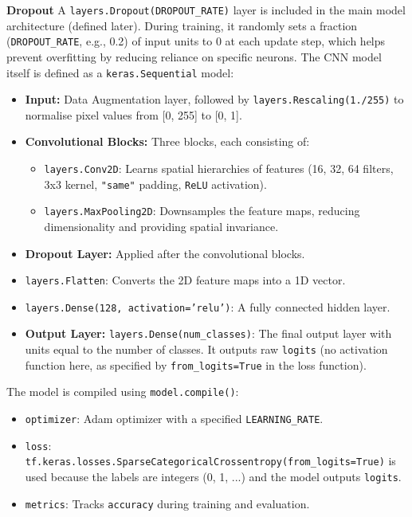 \textbf{Dropout}
A \verb|layers.Dropout(DROPOUT_RATE)| layer is included in the main model architecture (defined later). During training, it randomly sets a fraction (\verb|DROPOUT_RATE|, e.g., 0.2) of input units to 0 at each update step, which helps prevent overfitting by reducing reliance on specific neurons. The CNN model itself is defined as a \verb|keras.Sequential| model:
\begin{itemize}
    \item \textbf{Input:} Data Augmentation layer, followed by \verb|layers.Rescaling(1./255)| to normalise pixel values from [0, 255] to [0, 1].
    \item \textbf{Convolutional Blocks:} Three blocks, each consisting of:
    \begin{itemize}
        \item \verb|layers.Conv2D|: Learns spatial hierarchies of features (16, 32, 64 filters, 3x3 kernel, \verb|"same"| padding, \verb|ReLU| activation).
        \item \verb|layers.MaxPooling2D|: Downsamples the feature maps, reducing dimensionality and providing spatial invariance.
    \end{itemize}
    \item \textbf{Dropout Layer:} Applied after the convolutional blocks.
    \item \texttt{layers.Flatten}: Converts the 2D feature maps into a 1D vector.
    \item \texttt{layers.Dense(128, activation='relu')}: A fully connected hidden layer.
    \item \textbf{Output Layer:} \verb|layers.Dense(num_classes)|: The final output layer with units equal to the number of classes. It outputs raw \verb|logits| (no activation function here, as specified by \verb|from_logits=True| in the loss function).
\end{itemize}
The model is compiled using \verb|model.compile()|:
\begin{itemize}
    \item \texttt{optimizer}: Adam optimizer with a specified \verb|LEARNING_RATE|.
    \item \texttt{loss}: \verb|tf.keras.losses.SparseCategoricalCrossentropy(from_logits=True)| is used because the labels are integers (0, 1, ...) and the model outputs \verb|logits|.
    \item \verb|metrics|: Tracks \verb|accuracy| during training and evaluation.
\end{itemize}

